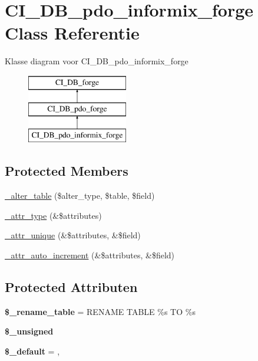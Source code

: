 \hypertarget{class_c_i___d_b__pdo__informix__forge}{}\section{C\+I\+\_\+\+D\+B\+\_\+pdo\+\_\+informix\+\_\+forge Class Referentie}
\label{class_c_i___d_b__pdo__informix__forge}
Klasse diagram voor C\+I\+\_\+\+D\+B\+\_\+pdo\+\_\+informix\+\_\+forge\begin{figure}[H]
\begin{center}
\leavevmode
\includegraphics[height=3.000000cm]{class_c_i___d_b__pdo__informix__forge}
\end{center}
\end{figure}
\subsection*{Protected Members}
\begin{DoxyCompactItemize}
\item 
\mbox{\hyperlink{class_c_i___d_b__pdo__informix__forge_a41c6cae02f2fda8b429ad0afb9509426}{\+\_\+alter\+\_\+table}} (\$alter\+\_\+type, \$table, \$field)
\item 
\mbox{\hyperlink{class_c_i___d_b__pdo__informix__forge_a8553be952084c6f7cdfff370a1d14f6b}{\+\_\+attr\+\_\+type}} (\&\$attributes)
\item 
\mbox{\hyperlink{class_c_i___d_b__pdo__informix__forge_a7568a93ea53a7392a63fffe83bb7a090}{\+\_\+attr\+\_\+unique}} (\&\$attributes, \&\$field)
\item 
\mbox{\hyperlink{class_c_i___d_b__pdo__informix__forge_a2a013a5932439c3c44f0dad3436525f7}{\+\_\+attr\+\_\+auto\+\_\+increment}} (\&\$attributes, \&\$field)
\end{DoxyCompactItemize}
\subsection*{Protected Attributen}
\begin{DoxyCompactItemize}
\item 
\mbox{\label{class_c_i___d_b__pdo__informix__forge_a1a649e7cf9de16bcf932977b18bc91de}} 
{\bfseries \$\+\_\+rename\+\_\+table} = \textquotesingle{}R\+E\+N\+A\+ME T\+A\+B\+LE \%s TO \%s\textquotesingle{}
\item 
{\bfseries \$\+\_\+unsigned}
\item 
\mbox{\label{class_c_i___d_b__pdo__informix__forge_aa119e1b4e3d00f47a7b83b7066087915}} 
{\bfseries \$\+\_\+default} = \textquotesingle{}, \textquotesingle{}
\end{DoxyCompactItemize}
